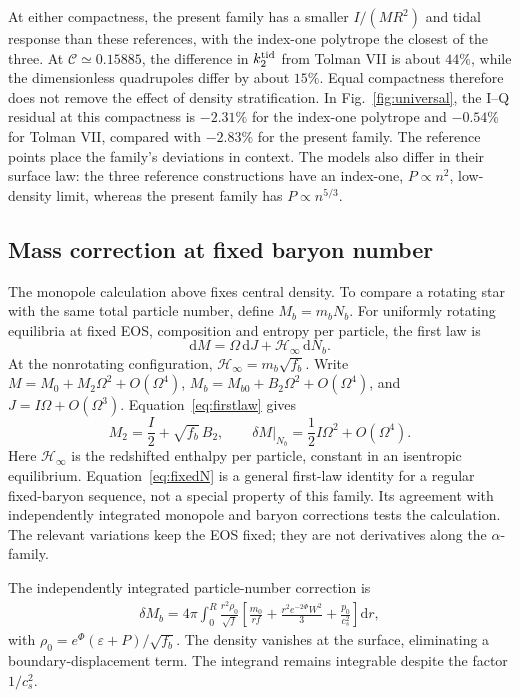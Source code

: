 \documentclass[journal,a4paper]{IEEEtran}
\newcommand{\dd}{\mathrm d}
\begin{document}
At either compactness, the present family has a smaller $I/(MR^2)$ and tidal response than these references, with the index-one polytrope the closest of the three. At $\mathcal C\simeq0.15885$, the difference in $k_2^{\rm tid}$ from Tolman VII is about $44\%$, while the dimensionless quadrupoles differ by about $15\%$. Equal compactness therefore does not remove the effect of density stratification. In Fig.~\ref{fig:universal}, the I--Q residual at this compactness is $-2.31\%$ for the index-one polytrope and $-0.54\%$ for Tolman VII, compared with $-2.83\%$ for the present family. The reference points place the family's deviations in context. The models also differ in their surface law: the three reference constructions have an index-one, $P\propto n^2$, low-density limit, whereas the present family has $P\propto n^{5/3}$.

\subsection{Mass correction at fixed baryon number}
The monopole calculation above fixes central density. To compare a rotating star with the same total particle number, define $M_b=m_bN_b$. For uniformly rotating equilibria at fixed EOS, composition and entropy per particle, the first law is~\cite{bardeen}
\begin{equation}
 \dd M=\Omega\,\dd J+\mathcal H_\infty\,\dd N_b.
 \label{eq:firstlaw}
\end{equation}
At the nonrotating configuration, $\mathcal H_\infty=m_b\sqrt{f_b}$. Write $M=M_0+M_2\Omega^2+O(\Omega^4)$, $M_b=M_{b0}+B_2\Omega^2+O(\Omega^4)$, and $J=I\Omega+O(\Omega^3)$. Equation~\eqref{eq:firstlaw} gives
\begin{equation}
 M_2=\frac I2+\sqrt{f_b}\,B_2,
 \qquad
 \left.\delta M\right|_{N_b}=\frac12I\Omega^2+O(\Omega^4).
 \label{eq:fixedN}
\end{equation}
Here $\mathcal H_\infty$ is the redshifted enthalpy per particle, constant in an isentropic equilibrium. Equation~\eqref{eq:fixedN} is a general first-law identity for a regular fixed-baryon sequence, not a special property of this family. Its agreement with independently integrated monopole and baryon corrections tests the calculation. The relevant variations keep the EOS fixed; they are not derivatives along the $\alpha$-family.

The independently integrated particle-number correction is
\begin{align}
 \delta M_b=4\pi\int_0^R\frac{r^2\rho_0}{\sqrt f}
 \left[\frac{m_0}{rf}+\frac{r^2e^{-2\Phi}W^2}{3}
                  +\frac{p_0}{c_s^2}\right]\dd r,
 \label{eq:baryon}
\end{align}
with $\rho_0=e^\Phi(\varepsilon+P)/\sqrt{f_b}$. The density vanishes at the surface, eliminating a boundary-displacement term. The integrand remains integrable despite the factor $1/c_s^2$.
\end{document}
